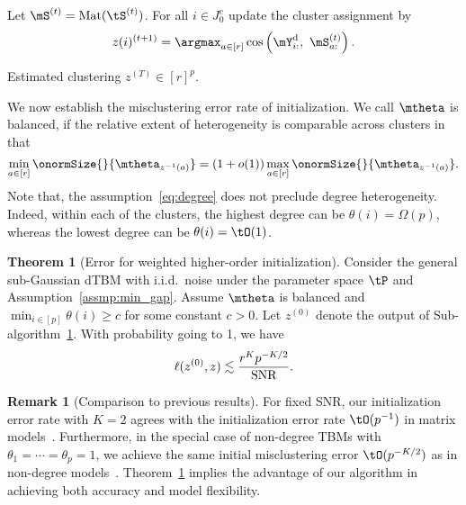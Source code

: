 \documentclass[lettersize,onecolumn,journal]{IEEEtran}
\theoremstyle{definition}
\newtheorem{thm}{Theorem}
\theoremstyle{definition}
\newtheorem{rmk}{Remark}
\begin{document}
\begin{algorithm}[h!]
\begin{algorithmic}[1]
\State Let $\mS^{(t)} = \text{Mat}(\tS^{(t)})$. For all $i \in J_0^c$ update the cluster assignment by
\begin{equation}
    z(i)^{(t+1)} = \argmax_{a \in [r]} \cos \left( \mY^{\text{d}}_{i:},\ \mS^{(t)}_{a:} \right).
\end{equation}

\EndFor

\OUTPUT Estimated clustering $z^{(T)}  \in [r]^{p}$.

\end{algorithmic}
\end{algorithm}

We now establish the misclustering error rate of initialization. We call $\mtheta$ is balanced, if the relative extent of heterogeneity is comparable across clusters in that
\begin{equation}\label{eq:degree}
{\min_{a\in[r]} \onormSize{}{\mtheta_{z^{-1}(a)}}=\left(1+o(1)\right)\max_{a\in[r]}\onormSize{}{\mtheta_{z^{-1}(a)}}}.
\end{equation}
Note that, the assumption~\eqref{eq:degree} does not preclude degree heterogeneity. Indeed, within each of the clusters, the highest degree can be $\theta(i) = \Omega(p)$, whereas the lowest degree can be $\theta(i)=\tO(1)$. 

\begin{thm}[Error for weighted higher-order initialization]\label{thm:initial} Consider the general sub-Gaussian dTBM with i.i.d.\ noise under the parameter space $\tP$ and Assumption~\ref{assmp:min_gap}. Assume $\mtheta$ is balanced and $\min_{i\in[p]}\theta(i) \geq c$ for some constant $c>0$. Let $ z^{(0)}$ denote the output of Sub-algorithm~\hyperref[alg:main]{1}. With probability going to 1, we have
\begin{equation}\label{eq:ini}
   \ell(z^{(0)}, z) \lesssim {r^K p^{-K/2}\over \text{SNR}}. 
\end{equation}
\end{thm}

\begin{rmk}[Comparison to previous results] For fixed SNR, our initialization error rate with $K=2$ agrees with the initialization error rate $\tO(p^{-1})$ in matrix models~\citep{gao2018community}. Furthermore, in the special case of non-degree TBMs with $\theta_1=\cdots=\theta_p=1$, we achieve the same initial misclustering error $\tO(p^{-K/2})$ as in non-degree models~\citep{han2020exact}. Theorem~\ref{thm:initial} implies the advantage of our algorithm in achieving both accuracy and model flexibility. 
\end{rmk}
\end{document}
